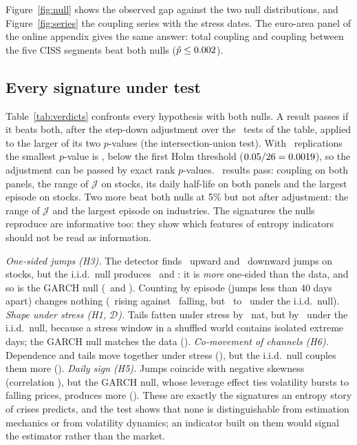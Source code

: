 \documentclass[12pt]{article}
\theoremstyle{definition}
\theoremstyle{remark}
\newcommand{\JJ}{\mathcal{J}}
\newcommand{\DD}{\mathcal{D}}
\begin{document}
\begin{doublespace}
Figure~\ref{fig:null} shows the observed gap against the two null
distributions, and Figure~\ref{fig:series} the coupling series with the
stress dates. The euro-area panel of the online appendix gives the same
answer: total coupling and coupling between the five CISS segments beat both
nulls ($\hat p\le0.002$).

\subsection{Every signature under test}

Table~\ref{tab:verdicts} confronts every hypothesis with both nulls. A result
passes if it beats both, after the \citet{holm1979} step-down adjustment over
the \holmNtests\ tests of the table, applied to the larger of its two
$p$-values (the intersection-union test). With \nRep\ replications the
smallest $p$-value is \pMin, below the first Holm threshold
($0.05/26=0.0019$), so the adjustment can be passed by exact
rank $p$-values. \holmNsurv\ results pass: coupling on both panels, the range of
$\JJ$ on stocks, its daily half-life on both panels and the largest episode on
stocks. Two more beat both nulls at 5\% but not after adjustment: the range of
$\JJ$ and the largest episode on industries. The signatures the nulls reproduce are informative too: they
show which features of entropy indicators should not be read as information.

\emph{One-sided jumps (H3).} The detector finds \qJumpUpSpObs\ upward and
\qJumpDownSpObs\ downward jumps on stocks, but the i.i.d.\ null produces
\qJumpUpSpIid\ and \qJumpDownSpIid: it is \emph{more} one-sided than the data, and
so is the GARCH null (\qJumpUpSpFhs\ and \qJumpDownSpFhs). Counting by episode
(jumps less than 40 days apart) changes nothing (\qEpUpSpObs\ rising against
\qEpDownSpObs\ falling, but \qEpUpSpIid\ to \qEpDownSpIid\ under the i.i.d.\ null).
\emph{Shape under stress (H1, $\DD$).} Tails fatten under stress by
\qDgapSpObs~nat, but by \qDgapSpIid\ under the i.i.d.\ null, because a stress
window in a shuffled world contains isolated extreme days; the GARCH null
matches the data (\qDgapSpFhs). \emph{Co-movement of channels (H6).}
Dependence and tails move together under stress (\qHsixStressSpObs), but the
i.i.d.\ null couples them more (\qHsixStressSpIid). \emph{Daily sign (H5).}
Jumps coincide with negative skewness (correlation \qHfiveCorrSpObs), but the
GARCH null, whose leverage effect ties volatility bursts to falling prices,
produces more (\qHfiveCorrSpFhs). These are exactly the signatures an entropy
story of crises predicts, and the test shows that none is distinguishable
from estimation mechanics or from volatility dynamics; an indicator built on
them would signal the estimator rather than the market.


\end{doublespace}
\end{document}
